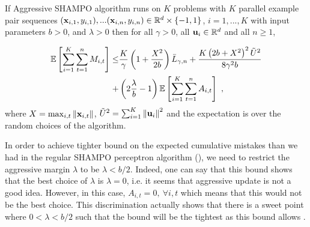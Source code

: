\begin{theorem}
  If Aggressive SHAMPO algorithm runs on $K$ problems with $K$ parallel example pair
  sequences
  $(\mathbf{x}_{i,1},y_{i,1}),...(\mathbf{x}_{i,n},y_{i,n})\in\mathbb{R}^d\times\{-1,1\}$,
  $i=1,...,K$ with input parameters $b>0$, and $\lambda>0$ then for all $\gamma>0$, all
  $\mathbf{u}_{i}\in\mathbb{R}^d$ and all $n\ge1$,
  
\begin{displaymath}
\begin{split}
\mathbb{E}\left[ \sum_{i=1}^{K}\sum_{t=1}^{n}{M_{i,t}} \right]
\le& \frac{K}{\gamma}\left(1+\frac{X^2}{2b} \right){\bar L}_{\gamma,n}+
\frac{K\left({2b+X^2}\right)^2\tilde{U}^2}{8{\gamma}^2b}\\ 
+&\left({2\frac{\lambda}{b}-1}\right)\mathbb{E}\left[{\sum_{i=1}^{K}\sum_{t=1}^{n}{A_{i,t}}}\right]~,
\label{bound_aggressive_FO_SHAMPO}
\end{split}
\end{displaymath}
 where $X=\max_{i,t}\Vert\mathbf{x}_{i,t}\Vert$,
$\tilde{U}^2=\sum_{i=1}^{K}\left\Vert {\mathbf{u}_{i}} \right\Vert^2$ and the expectation is over the
random choices of the algorithm.
\end{theorem} \label{thm:FO_bound_aggressive}

In order to achieve tighter bound on the expected cumulative mistakes than we had in the regular SHAMPO perceptron algorithm (), we need to restrict the aggressive margin  $\lambda$ to be $\lambda<b/2$. Indeed, one can say that this bound shows that the best choice of $\lambda$ is $\lambda=0$, i.e. it seems that aggressive update is not a good idea. However, in this case, $A_{i,t}=0,~ \forall i,t$ which means that this would not be the best choice. This discrimination actually shows  that there is a sweet point where $0<\lambda<b/2$ such that the bound will be the  tightest as this bound allows . 
\\

